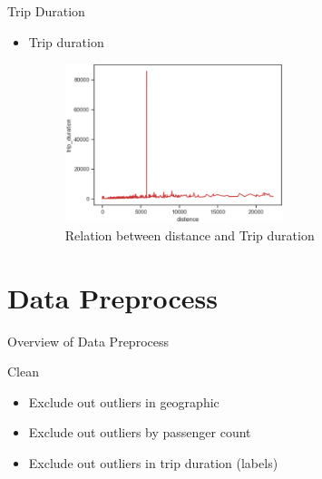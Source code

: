 \documentclass[
 size=12pt,
 paper=smartboard, %
 mode=present, %
 display=slides, %
style=tuliplab,
pauseslide,
fleqn,leqno]{powerdot}
\begin{document}
\begin{slide}{Trip Duration}
  \begin{itemize}
    \item Trip duration
    \begin{figure}[h]
      \centering
      \includegraphics[width=0.6\textwidth]{figures2/distence_trip_duration_relation.eps}
      \caption{Relation between distance and Trip duration}
      \label{fig:trip-duration-distribution-picture}
    \end{figure}
  \end{itemize}
\end{slide}


\section{Data Preprocess}

\begin{slide}[toc=,bm=]{Overview of Data Preprocess}
  \tableofcontents[content=currentsection,type=0]
\end{slide}

\begin{slide}{Clean}
  \begin{itemize}
    \item Exclude out outliers in geographic \pause
    \item Exclude out outliers by passenger count \pause
    \item Exclude out outliers in trip duration (labels) \pause
  \end{itemize}
\end{slide}
\end{document}
